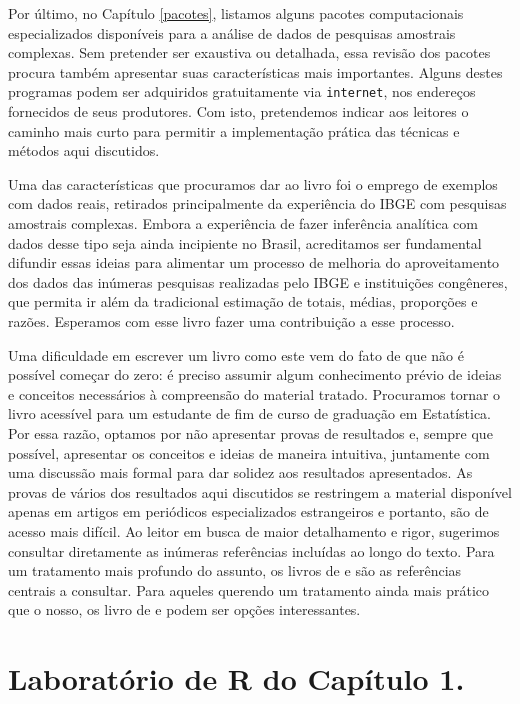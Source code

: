 \documentclass[]{book}
\theoremstyle{definition}
\theoremstyle{definition}
\theoremstyle{definition}
\theoremstyle{remark}
\begin{document}
Por último, no Capítulo \ref{pacotes}, listamos alguns pacotes
computacionais especializados disponíveis para a análise de dados de
pesquisas amostrais complexas. Sem pretender ser exaustiva ou detalhada,
essa revisão dos pacotes procura também apresentar suas características
mais importantes. Alguns destes programas podem ser adquiridos
gratuitamente via \texttt{internet}, nos endereços fornecidos de seus
produtores. Com isto, pretendemos indicar aos leitores o caminho mais
curto para permitir a implementação prática das técnicas e métodos aqui
discutidos.

Uma das características que procuramos dar ao livro foi o emprego de
exemplos com dados reais, retirados principalmente da experiência do
IBGE com pesquisas amostrais complexas. Embora a experiência de fazer
inferência analítica com dados desse tipo seja ainda incipiente no
Brasil, acreditamos ser fundamental difundir essas ideias para alimentar
um processo de melhoria do aproveitamento dos dados das inúmeras
pesquisas realizadas pelo IBGE e instituições congêneres, que permita ir
além da tradicional estimação de totais, médias, proporções e razões.
Esperamos com esse livro fazer uma contribuição a esse processo.

Uma dificuldade em escrever um livro como este vem do fato de que não é
possível começar do zero: é preciso assumir algum conhecimento prévio de
ideias e conceitos necessários à compreensão do material tratado.
Procuramos tornar o livro acessível para um estudante de fim de curso de
graduação em Estatística. Por essa razão, optamos por não apresentar
provas de resultados e, sempre que possível, apresentar os conceitos e
ideias de maneira intuitiva, juntamente com uma discussão mais formal
para dar solidez aos resultados apresentados. As provas de vários dos
resultados aqui discutidos se restringem a material disponível apenas em
artigos em periódicos especializados estrangeiros e portanto, são de
acesso mais difícil. Ao leitor em busca de maior detalhamento e rigor,
sugerimos consultar diretamente as inúmeras referências incluídas ao
longo do texto. Para um tratamento mais profundo do assunto, os livros
de \citep{SHS89} e \citep{CHSK2003} são as referências centrais a
consultar. Para aqueles querendo um tratamento ainda mais prático que o
nosso, os livro de \citep{lethonen} e \citep{heeringa} podem ser opções
interessantes.

\section{Laboratório de R do Capítulo 1.}\label{epa}
\end{document}
